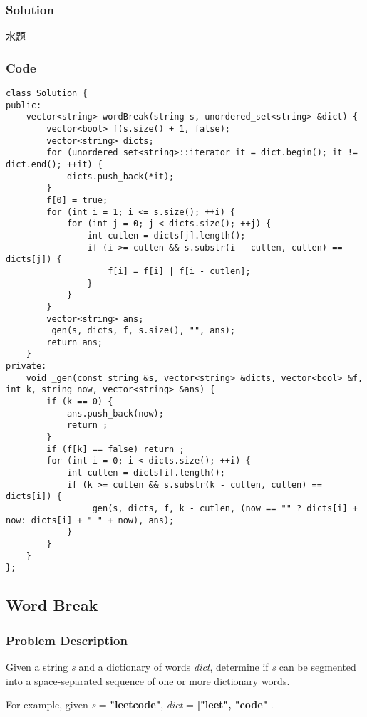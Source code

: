 \documentclass{article}
\begin{document}
\begin{CJK*}{UTF8}{gkai}
\subsubsection*{Solution}
水题

\subsubsection*{Code}
\begin{lstlisting}
class Solution {
public:
    vector<string> wordBreak(string s, unordered_set<string> &dict) {
        vector<bool> f(s.size() + 1, false);
        vector<string> dicts;
        for (unordered_set<string>::iterator it = dict.begin(); it != dict.end(); ++it) {
            dicts.push_back(*it);
        }
        f[0] = true;
        for (int i = 1; i <= s.size(); ++i) {
            for (int j = 0; j < dicts.size(); ++j) {
                int cutlen = dicts[j].length();
                if (i >= cutlen && s.substr(i - cutlen, cutlen) == dicts[j]) {
                    f[i] = f[i] | f[i - cutlen];
                }
            }
        }
        vector<string> ans;
        _gen(s, dicts, f, s.size(), "", ans);
        return ans;
    }
private:
    void _gen(const string &s, vector<string> &dicts, vector<bool> &f, int k, string now, vector<string> &ans) {
        if (k == 0) {
            ans.push_back(now);
            return ;
        }
        if (f[k] == false) return ;
        for (int i = 0; i < dicts.size(); ++i) {
            int cutlen = dicts[i].length();
            if (k >= cutlen && s.substr(k - cutlen, cutlen) == dicts[i]) {
                _gen(s, dicts, f, k - cutlen, (now == "" ? dicts[i] + now: dicts[i] + " " + now), ans);
            }
        }
    }
}; 
\end{lstlisting}


\subsection{ Word Break }
\label{ Word Break }

\subsubsection*{Problem Description}
Given a string \emph{s} and a dictionary of words \emph{dict}, determine if \emph{s} can be segmented into a space-separated sequence of one or more dictionary words.

For example, given
\emph{s} = \textbf{"leetcode"},
\emph{dict} = \textbf{["leet", "code"]}.


\end{CJK*}
\end{document}
